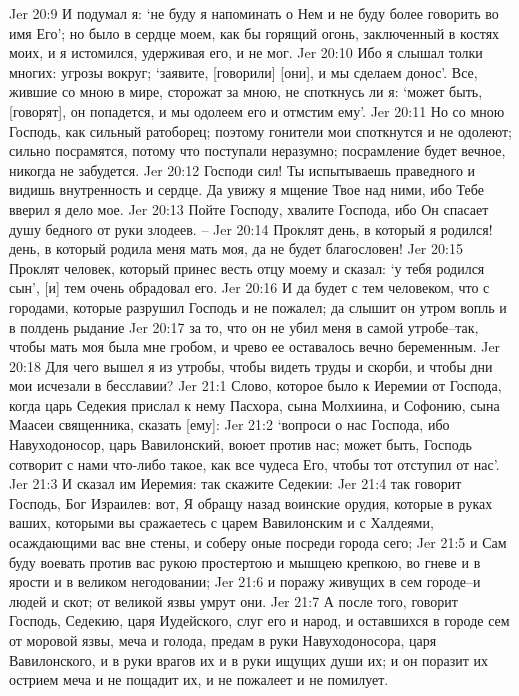 Jer 20:9  И подумал я: `не буду я напоминать о Нем и не буду более говорить во имя Его'; но было в сердце моем, как бы горящий огонь, заключенный в костях моих, и я истомился, удерживая его, и не мог.
Jer 20:10  Ибо я слышал толки многих: угрозы вокруг; `заявите, [говорили] [они], и мы сделаем донос'. Все, жившие со мною в мире, сторожат за мною, не споткнусь ли я: `может быть, [говорят], он попадется, и мы одолеем его и отмстим ему'.
Jer 20:11  Но со мною Господь, как сильный ратоборец; поэтому гонители мои споткнутся и не одолеют; сильно посрамятся, потому что поступали неразумно; посрамление будет вечное, никогда не забудется.
Jer 20:12  Господи сил! Ты испытываешь праведного и видишь внутренность и сердце. Да увижу я мщение Твое над ними, ибо Тебе вверил я дело мое.
Jer 20:13  Пойте Господу, хвалите Господа, ибо Он спасает душу бедного от руки злодеев. --
Jer 20:14  Проклят день, в который я родился! день, в который родила меня мать моя, да не будет благословен!
Jer 20:15  Проклят человек, который принес весть отцу моему и сказал: `у тебя родился сын', [и] тем очень обрадовал его.
Jer 20:16  И да будет с тем человеком, что с городами, которые разрушил Господь и не пожалел; да слышит он утром вопль и в полдень рыдание
Jer 20:17  за то, что он не убил меня в самой утробе--так, чтобы мать моя была мне гробом, и чрево ее оставалось вечно беременным.
Jer 20:18  Для чего вышел я из утробы, чтобы видеть труды и скорби, и чтобы дни мои исчезали в бесславии?
Jer 21:1  Слово, которое было к Иеремии от Господа, когда царь Седекия прислал к нему Пасхора, сына Молхиина, и Софонию, сына Маасеи священника, сказать [ему]:
Jer 21:2  `вопроси о нас Господа, ибо Навуходоносор, царь Вавилонский, воюет против нас; может быть, Господь сотворит с нами что-либо такое, как все чудеса Его, чтобы тот отступил от нас'.
Jer 21:3  И сказал им Иеремия: так скажите Седекии:
Jer 21:4  так говорит Господь, Бог Израилев: вот, Я обращу назад воинские орудия, которые в руках ваших, которыми вы сражаетесь с царем Вавилонским и с Халдеями, осаждающими вас вне стены, и соберу оные посреди города сего;
Jer 21:5  и Сам буду воевать против вас рукою простертою и мышцею крепкою, во гневе и в ярости и в великом негодовании;
Jer 21:6  и поражу живущих в сем городе--и людей и скот; от великой язвы умрут они.
Jer 21:7  А после того, говорит Господь, Седекию, царя Иудейского, слуг его и народ, и оставшихся в городе сем от моровой язвы, меча и голода, предам в руки Навуходоносора, царя Вавилонского, и в руки врагов их и в руки ищущих души их; и он поразит их острием меча и не пощадит их, и не пожалеет и не помилует.
